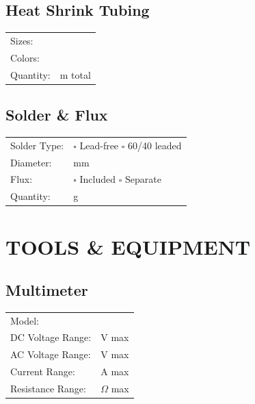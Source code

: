 \documentclass[10pt,letterpaper]{article}
\begin{document}
\subsection*{Heat Shrink Tubing}
\begin{tabularx}{\textwidth}{lX}
Sizes: & \underline{\hspace{8cm}} \\
Colors: & \underline{\hspace{8cm}} \\
Quantity: & \underline{\hspace{3cm}} m total \\
\end{tabularx}

\subsection*{Solder \& Flux}
\begin{tabularx}{\textwidth}{lX}
Solder Type: & $\square$ Lead-free $\square$ 60/40 leaded \\
Diameter: & \underline{\hspace{3cm}} mm \\
Flux: & $\square$ Included $\square$ Separate \\
Quantity: & \underline{\hspace{3cm}} g \\
\end{tabularx}

\newpage

\section*{TOOLS \& EQUIPMENT}

\subsection*{Multimeter}
\begin{tabularx}{\textwidth}{lX}
Model: & \underline{\hspace{8cm}} \\
DC Voltage Range: & \underline{\hspace{3cm}} V max \\
AC Voltage Range: & \underline{\hspace{3cm}} V max \\
Current Range: & \underline{\hspace{3cm}} A max \\
Resistance Range: & \underline{\hspace{3cm}} $\Omega$ max \\
\end{tabularx}
\end{document}
